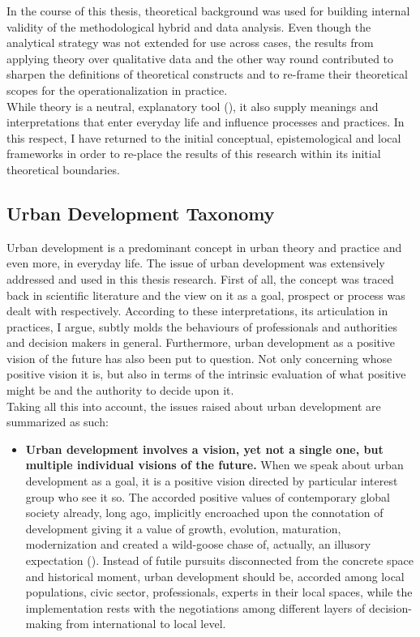 \documentclass[11pt]{report}
\begin{document}
{In the course of this thesis, theoretical background was used for building internal validity of the methodological hybrid and data analysis.
Even though the analytical strategy was not extended for use across cases, the results from applying theory over qualitative data and the other way round contributed to sharpen the definitions of theoretical constructs and to re-frame their theoretical scopes for the operationalization in practice.
\\

While theory is a neutral, explanatory tool (\href{Sears}{\citealt{sears_good_2005}}), it also supply meanings and interpretations that enter everyday life and influence processes and practices.
In this respect, I have returned to the initial conceptual, epistemological and local frameworks in order to re-place the results of this research within its initial theoretical boundaries.

\subsection{Urban Development Taxonomy}

Urban development is a predominant concept in urban theory and practice and even more, in everyday life.
The issue of urban development was extensively addressed and used in this thesis research.
First of all, the concept was traced back in scientific literature and the view on it as a goal, prospect or process was dealt with respectively.
According to these interpretations, its articulation in practices, I argue, subtly molds the behaviours of professionals and authorities and decision makers in general.
Furthermore, urban development as a positive vision of the future has also been put to question.
Not only concerning whose positive vision it is, but also in terms of the intrinsic evaluation of what positive might be and the authority to decide upon it.
\\

Taking all this into account, the issues raised about urban development are summarized as such:

\begin{itemize}

\item \textbf{Urban development involves a vision, yet not a single one, but multiple individual visions of the future.}
When we speak about urban development as a goal, it is a positive vision directed by particular interest group who see it so.
The accorded positive values of contemporary global society already, long ago, implicitly encroached upon the connotation of development giving it a value of growth, evolution, maturation, modernization and created a wild-goose chase of, actually, an illusory expectation
(\href{Esteva}{\citealt{esteva_development_2010}}).
Instead of futile pursuits disconnected from the concrete space and historical moment, urban development should be, accorded among local populations, civic sector, professionals, experts in their local spaces, while the implementation rests with the negotiations among different layers of decision-making from international to local level.


\end{itemize}}
\end{document}
